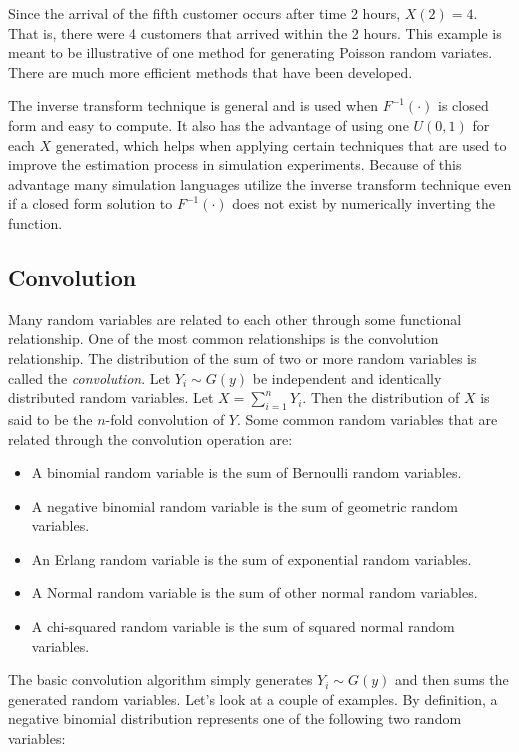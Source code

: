 \documentclass[
]{book}
\theoremstyle{definition}
\theoremstyle{definition}
\theoremstyle{definition}
\theoremstyle{definition}
\theoremstyle{remark}
\begin{document}
Since the arrival of the fifth customer occurs after time 2 hours,
\(X(2) = 4\). That is, there were 4 customers that arrived within the 2
hours. This example is meant to be illustrative of one method for generating Poisson random variates. There are much more efficient methods that have been developed.

The inverse transform technique is general and is used when
\(F^{-1}(\cdot)\) is closed form and easy to compute. It also has the
advantage of using one \(U(0,1)\) for each \(X\) generated, which helps when
applying certain techniques that are used to improve the estimation
process in simulation experiments. Because of this advantage many
simulation languages utilize the inverse transform technique even if a
closed form solution to \(F^{-1}(\cdot)\) does not exist by numerically
inverting the function.

\hypertarget{convolution}{%
\subsection{Convolution}\label{convolution}}

Many random variables are related to each other through some functional
relationship. One of the most common relationships is the convolution
relationship. The distribution of the sum of two or more random
variables is called the \emph{convolution}. Let \(Y_{i} \sim G(y)\) be
independent and identically distributed random variables. Let
\(X = \sum\nolimits_{i=1}^{n} Y_{i}\). Then the distribution of \(X\) is
said to be the \(n\)-fold convolution of \(Y\). Some common random variables
that are related through the convolution operation are:

\begin{itemize}
\item
  A binomial random variable is the sum of Bernoulli random variables.
\item
  A negative binomial random variable is the sum of geometric random
  variables.
\item
  An Erlang random variable is the sum of exponential random
  variables.
\item
  A Normal random variable is the sum of other normal random
  variables.
\item
  A chi-squared random variable is the sum of squared normal random
  variables.
\end{itemize}

The basic convolution algorithm simply generates \(Y_{i} \sim G(y)\) and
then sums the generated random variables. Let's look at a couple of examples. By definition, a negative binomial distribution represents one of the following two random variables:
\end{document}

